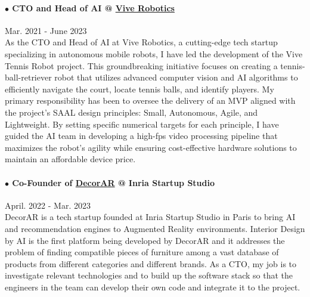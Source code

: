 \documentclass[10pt]{res}
\begin{document}
\begin{resume}
\paragraph{$\bullet$ CTO and Head of AI @ \href{http://vivetennis.com} {Vive Robotics}} \hfill Mar. 2021 - June 2023\\
As the CTO and Head of AI at Vive Robotics, a cutting-edge tech startup specializing in autonomous mobile robots, I have led the development of the Vive Tennis Robot project. This groundbreaking initiative focuses on creating a tennis-ball-retriever robot that utilizes advanced computer vision and AI algorithms to efficiently navigate the court, locate tennis balls, and identify players. My primary responsibility has been to oversee the delivery of an 
MVP aligned with the project's SAAL design principles: Small, Autonomous, Agile, and Lightweight. By setting specific numerical targets for each principle, I have guided the AI team in developing a high-fps video processing pipeline that maximizes the robot's agility while ensuring cost-effective hardware solutions to maintain an affordable device price.
\vspace{-12pt}

\paragraph{$\bullet$ Co-Founder of \href{http://decorar.ai} {DecorAR} @ Inria Startup Studio} \hfill April. 2022 - Mar. 2023\\
DecorAR is a tech startup founded at Inria Startup Studio in Paris to bring AI and recommendation engines to Augmented Reality environments. Interior Design by AI is the first platform being developed by DecorAR and it addresses the problem of finding compatible pieces of furniture among a vast database of products from different categories and different brands. As a CTO, my job is to investigate relevant technologies and to build up the software stack so that the engineers in the team can develop their own code and integrate it to the project. 
\vspace{-12pt}


\end{resume}
\end{document}
